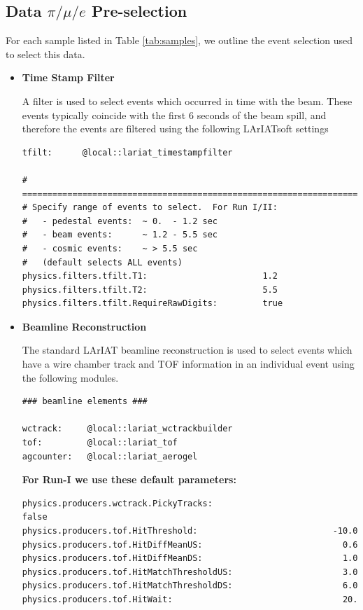 \subsection{Data $\pi/\mu/e$ Pre-selection}\label{sec:DataPreSelection}
For each sample listed in Table \ref{tab:samples}, we outline the event selection used to select this data.

\begin{itemize}
\item \textbf{Time Stamp Filter}

A filter is used to select events which occurred in time with the beam. These events typically coincide with the first 6 seconds of the beam spill, and therefore the events are filtered using the following LArIATsoft settings

\begin{verbatim}
tfilt:      @local::lariat_timestampfilter

# ====================================================================
# Specify range of events to select.  For Run I/II:
#   - pedestal events:  ~ 0.  - 1.2 sec
#   - beam events:      ~ 1.2 - 5.5 sec
#   - cosmic events:    ~ > 5.5 sec
#   (default selects ALL events)
physics.filters.tfilt.T1:                       1.2
physics.filters.tfilt.T2:                       5.5
physics.filters.tfilt.RequireRawDigits:         true

\end{verbatim}



\item \textbf{Beamline Reconstruction}

The standard LArIAT beamline reconstruction is used to select events which have a wire chamber track and TOF information in an individual event using the following modules.
\begin{verbatim}
### beamline elements ###

wctrack:     @local::lariat_wctrackbuilder
tof:         @local::lariat_tof
agcounter:   @local::lariat_aerogel
\end{verbatim}


\textbf{For Run-I we use these default parameters:}
\begin{verbatim} 
physics.producers.wctrack.PickyTracks:                          false
physics.producers.tof.HitThreshold:                           -10.0  
physics.producers.tof.HitDiffMeanUS:                            0.6  
physics.producers.tof.HitDiffMeanDS:                            1.0  
physics.producers.tof.HitMatchThresholdUS:                      3.0  
physics.producers.tof.HitMatchThresholdDS:                      6.0  
physics.producers.tof.HitWait:                                  20.
\end{verbatim}


\end{itemize}
